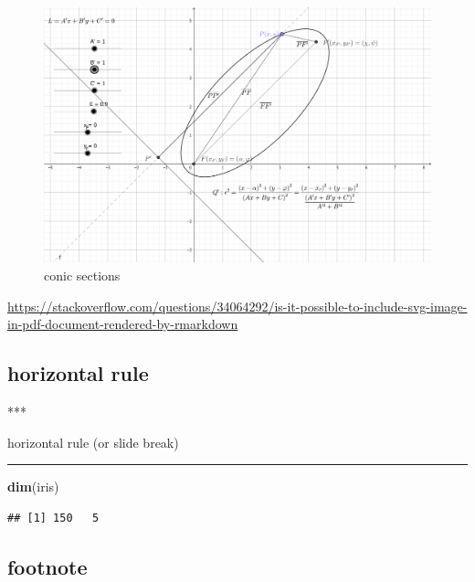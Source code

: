 \documentclass[
]{book}
\newenvironment{Shaded}{\begin{snugshade}}{\end{snugshade}}
\newcommand{\FunctionTok}[1]{\textcolor[rgb]{0.13,0.29,0.53}{\textbf{#1}}}
\newcommand{\NormalTok}[1]{#1}
\theoremstyle{definition}
\theoremstyle{definition}
\theoremstyle{definition}
\theoremstyle{definition}
\theoremstyle{remark}
\begin{document}
\begin{figure}
\includegraphics[width=0.75\linewidth]{img/conic-sections} \caption{conic sections}\label{fig:unnamed-chunk-26}
\end{figure}

\url{https://stackoverflow.com/questions/34064292/is-it-possible-to-include-svg-image-in-pdf-document-rendered-by-rmarkdown}

\hypertarget{horizontal-rule}{%
\subsection{horizontal rule}\label{horizontal-rule}}

\begin{Shaded}
\begin{Highlighting}[]
\NormalTok{***}
\end{Highlighting}
\end{Shaded}

horizontal rule (or slide break)

\begin{center}\rule{0.5\linewidth}{0.5pt}\end{center}

\begin{Shaded}
\begin{Highlighting}[]
\FunctionTok{dim}\NormalTok{(iris) }
\end{Highlighting}
\end{Shaded}

\begin{verbatim}
## [1] 150   5
\end{verbatim}

\hypertarget{footnote}{%
\subsection{footnote}\label{footnote}}
\end{document}
